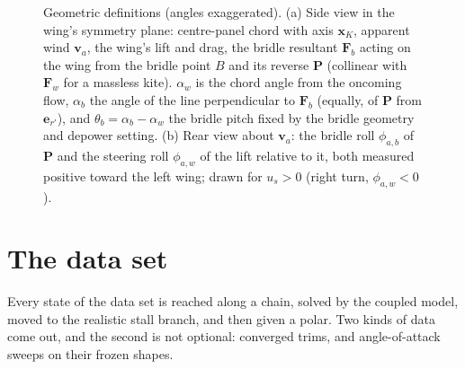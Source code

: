 \documentclass[11pt,a4paper]{article}
\begin{document}
\begin{figure}[H]
\caption{Geometric definitions (angles exaggerated). (a) Side view in the
wing's symmetry plane: centre-panel chord with axis $\mathbf x_K$, apparent
wind $\mathbf v_a$, the wing's lift and drag, the bridle resultant
$\mathbf F_b$ acting on the wing from the bridle point $B$ and its reverse
$\mathbf P$ (collinear with $\mathbf F_w$ for a massless kite). $\alpha_w$ is
the chord angle from the oncoming flow, $\alpha_b$ the angle of the line
perpendicular to $\mathbf F_b$ (equally, of $\mathbf P$ from
$\mathbf e_{r'}$), and $\theta_b=\alpha_b-\alpha_w$ the bridle pitch fixed
by the bridle geometry and depower setting. (b) Rear view about
$\mathbf v_a$: the bridle roll $\phi_{a,b}$ of $\mathbf P$ and the steering
roll $\phi_{a,w}$ of the lift relative to it, both measured positive toward
the left wing; drawn for $u_s>0$ (right turn, $\phi_{a,w}<0$).}
\label{fig:geometry}
\end{figure}

\section{The data set}
\label{sec:data}
Every state of the data set is reached along a chain, solved by the coupled model,
moved to the realistic stall branch, and then given a polar. Two kinds of data
come out, and the second is not optional: converged trims, and angle-of-attack
sweeps on their frozen shapes.
\end{document}
